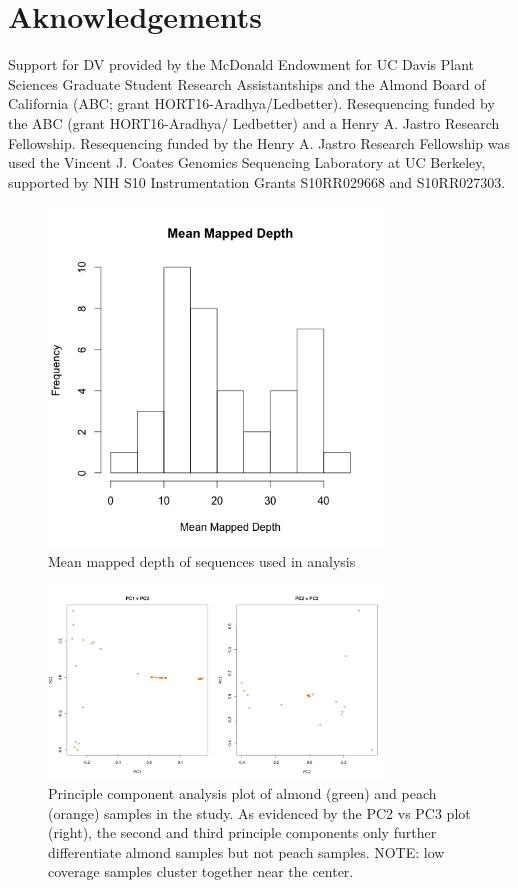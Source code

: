 \documentclass[12pt]{article}
\begin{document}
\section*{Aknowledgements}
Support for DV provided by the McDonald Endowment for UC Davis Plant Sciences Graduate Student Research Assistantships and the Almond Board of California (ABC; grant HORT16-Aradhya/Ledbetter). 
%
Resequencing funded by the ABC (grant HORT16-Aradhya/ Ledbetter) and a Henry A. Jastro Research Fellowship. 
%
Resequencing funded by the Henry A. Jastro Research Fellowship was used the Vincent J. Coates Genomics Sequencing Laboratory at UC Berkeley, supported by NIH S10 Instrumentation Grants S10RR029668 and S10RR027303.
%
\pagebreak

%
%
\pagebreak
\begin{figure}[b]
\centering
   \includegraphics[width=0.8\textwidth]{depthBQ20MQ30.png}
  \caption{Mean mapped depth of sequences used in analysis}
  \label{fig:depth}
\end{figure}
%
\pagebreak
\begin{figure}[b]
\centering
   \includegraphics[width=0.8\textwidth]{pca.png}
  \caption{Principle component analysis plot of almond (green) and peach (orange) samples in the study. As evidenced by the PC2 vs PC3 plot (right), the second and third principle components only further differentiate almond samples but not peach samples. NOTE: low coverage samples cluster together near the center.}
  \label{fig:pca}
\end{figure}
\end{document}

